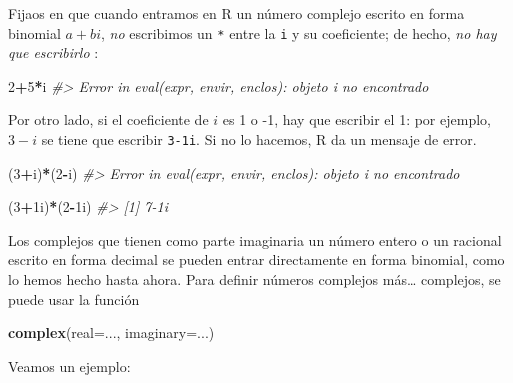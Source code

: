 \documentclass[
]{book}
\newenvironment{Shaded}{\begin{snugshade}}{\end{snugshade}}
\newcommand{\CommentTok}[1]{\textcolor[rgb]{0.56,0.35,0.01}{\textit{#1}}}
\newcommand{\DataTypeTok}[1]{\textcolor[rgb]{0.13,0.29,0.53}{#1}}
\newcommand{\DecValTok}[1]{\textcolor[rgb]{0.00,0.00,0.81}{#1}}
\newcommand{\KeywordTok}[1]{\textcolor[rgb]{0.13,0.29,0.53}{\textbf{#1}}}
\newcommand{\NormalTok}[1]{#1}
\newcommand{\OperatorTok}[1]{\textcolor[rgb]{0.81,0.36,0.00}{\textbf{#1}}}
\theoremstyle{definition}
\theoremstyle{definition}
\theoremstyle{definition}
\theoremstyle{remark}
\begin{document}
Fijaos en que cuando entramos en R un número complejo escrito en forma binomial \(a+bi\), \emph{no} escribimos un \texttt{*} entre la \texttt{i} y su coeficiente; de hecho, \emph{no hay que escribirlo} :

\begin{Shaded}
\begin{Highlighting}[]
\DecValTok{2}\OperatorTok{+}\DecValTok{5}\OperatorTok{*}\NormalTok{i}
\CommentTok{\#\textgreater{} Error in eval(expr, envir, enclos): objeto \textquotesingle{}i\textquotesingle{} no encontrado}
\end{Highlighting}
\end{Shaded}

Por otro lado, si el coeficiente de \(i\) es 1 o -1, hay que escribir el 1: por ejemplo, \(3-i\) se tiene que escribir \texttt{3-1i}. Si no lo hacemos, R da un mensaje de error.

\begin{Shaded}
\begin{Highlighting}[]
\NormalTok{(}\DecValTok{3}\OperatorTok{+}\NormalTok{i)}\OperatorTok{*}\NormalTok{(}\DecValTok{2}\OperatorTok{{-}}\NormalTok{i)}
\CommentTok{\#\textgreater{} Error in eval(expr, envir, enclos): objeto \textquotesingle{}i\textquotesingle{} no encontrado}
\end{Highlighting}
\end{Shaded}

\begin{Shaded}
\begin{Highlighting}[]
\NormalTok{(}\DecValTok{3}\OperatorTok{+}\NormalTok{1i)}\OperatorTok{*}\NormalTok{(}\DecValTok{2}\OperatorTok{{-}}\NormalTok{1i)}
\CommentTok{\#\textgreater{} [1] 7{-}1i}
\end{Highlighting}
\end{Shaded}

Los complejos que tienen como parte imaginaria un número entero o un racional escrito en forma decimal se pueden entrar directamente en forma binomial, como lo hemos hecho hasta ahora. Para definir números complejos más\ldots{} complejos, se puede usar la función

\begin{Shaded}
\begin{Highlighting}[]
\KeywordTok{complex}\NormalTok{(}\DataTypeTok{real=}\NormalTok{..., }\DataTypeTok{imaginary=}\NormalTok{...)}
\end{Highlighting}
\end{Shaded}

Veamos un ejemplo:
\end{document}
